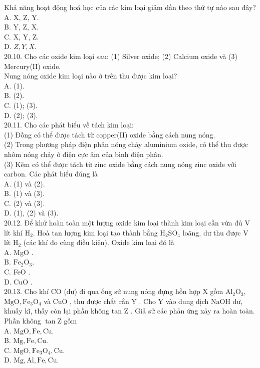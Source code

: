 \documentclass[10pt]{article}
\begin{document}
Khả năng hoạt động hoá học của các kim loại giảm dần theo thứ tự nào sau đây?\\
A. X, Z, Y.\\
B. Y, Z, X.\\
C. X, Y, Z.\\
D. $Z, Y, X$.\\
20.10. Cho các oxide kim loại sau: (1) Silver oxide; (2) Calcium oxide và (3) Mercury(II) oxide.\\
Nung nóng oxide kim loại nào ở trên thu được kim loại?\\
A. (1).\\
B. (2).\\
C. (1); (3).\\
D. (2); (3).\\
20.11. Cho các phát biểu về tách kim loại:\\
(1) Đồng có thể được tách từ copper(II) oxide bằng cách nung nóng.\\
(2) Trong phương pháp điện phân nóng chảy aluminium oxide, có thể thu được nhôm nóng chảy ở điện cực âm của bình điện phân.\\
(3) Kẽm có thể được tách từ zinc oxide bằng cách nung nóng zinc oxide với carbon. Các phát biểu đúng là\\
A. (1) và (2).\\
B. (1) và (3).\\
C. (2) và (3).\\
D. (1), (2) và (3).\\
20.12. Để khử hoàn toàn một lượng oxide kim loại thành kim loại cần vừa đủ V lít khí $\mathrm{H}_{2}$. Hoà tan lượng kim loại tạo thành bằng $\mathrm{H}_{2} \mathrm{SO}_{4}$ loãng, dư thu được V lít $\mathrm{H}_{2}$ (các khí đo cùng điều kiện). Oxide kim loại đó là\\
A. MgO .\\
B. $\mathrm{Fe}_{2} \mathrm{O}_{3}$.\\
C. FeO .\\
D. CuO .\\
20.13. Cho khí CO (dư) đi qua ống sứ nung nóng đựng hỗn hợp X gồm $\mathrm{Al}_{2} \mathrm{O}_{3}$, $\mathrm{MgO}, \mathrm{Fe}_{3} \mathrm{O}_{4}$ và CuO , thu được chất rắn Y . Cho Y vào dung dịch NaOH dư, khuấy kĩ, thấy còn lại phần không tan Z . Giả sử các phản ứng xảy ra hoàn toàn. Phần không $\tan \mathrm{Z}$ gồm\\
A. $\mathrm{MgO}, \mathrm{Fe}, \mathrm{Cu}$.\\
B. $\mathrm{Mg}, \mathrm{Fe}, \mathrm{Cu}$.\\
C. $\mathrm{MgO}, \mathrm{Fe}_{3} \mathrm{O}_{4}, \mathrm{Cu}$.\\
D. $\mathrm{Mg}, \mathrm{Al}, \mathrm{Fe}, \mathrm{Cu}$.
\end{document}
